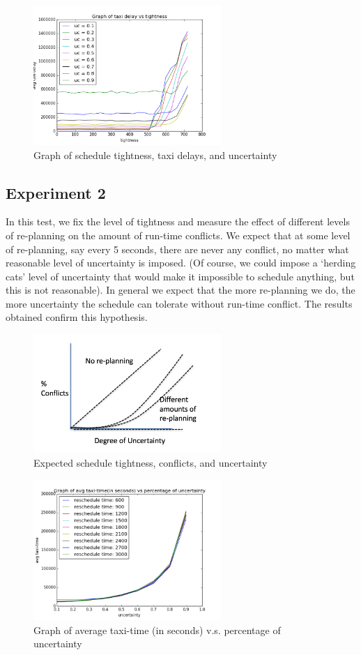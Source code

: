\documentclass[conference]{IEEEtran}
\begin{document}
\begin{figure}[!t]
\centering
\includegraphics[width=2.8in]{exp1-g2}
\caption{Graph of schedule tightness, taxi delays, and uncertainty\label{exp1-g2}}
\end{figure}

\subsection{Experiment 2}

In this test, we fix the level of tightness and measure the effect of different levels of re-planning on the amount of run-time conflicts. We expect that at some level of re-planning, say every 5 seconds, there are never any conflict, no matter what reasonable level of uncertainty is imposed. (Of course, we could impose a `herding cats' level of uncertainty that would make it impossible to schedule anything, but this is not reasonable). In general we expect that the more re-planning we do, the more uncertainty the schedule can tolerate without run-time conflict. The results obtained confirm this hypothesis.

\begin{figure}[!t]
\centering
\includegraphics[width=2.8in]{exp2-expected}
\caption{Expected schedule tightness, conflicts, and uncertainty\label{exp2-expected}}
\end{figure}

\begin{figure}[!t]
\centering
\includegraphics[width=2.8in]{exp2-g1}
\caption{Graph of average taxi-time (in seconds) v.s. percentage of uncertainty\label{exp2-g1}}
\end{figure}
\end{document}
